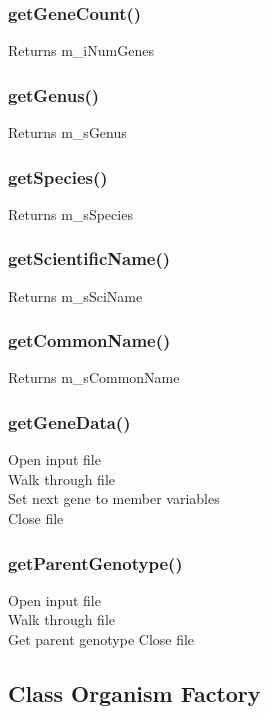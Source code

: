 \documentclass{article}
\begin{document}
\subsubsection{getGeneCount()}
\indent Returns m\_iNumGenes\\

\subsubsection{getGenus()}
\indent Returns m\_sGenus\\

\subsubsection{getSpecies()}
\indent Returns m\_sSpecies\\

\subsubsection{getScientificName()}
\indent Returns m\_sSciName\\

\subsubsection{getCommonName()}
\indent Returns m\_sCommonName\\

\subsubsection{getGeneData()}
\indent Open input file\\
\indent Walk through file\\
\indent\indent Set next gene to member variables\\
\indent Close file\\

\subsubsection{getParentGenotype()}
\indent Open input file\\
\indent Walk through file\\
\indent\indent Get parent genotype
\indent Close file\\

\newpage

\subsection{Class Organism Factory}
\end{document}
